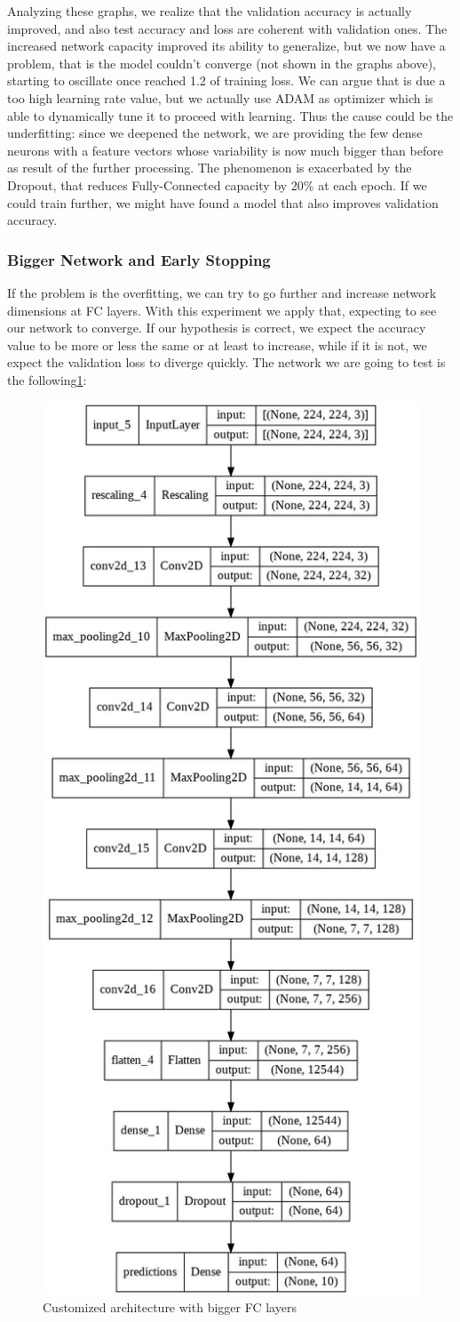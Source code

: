 \noindent Analyzing these graphs, we realize that the validation accuracy is actually improved, and also test accuracy and loss are coherent with validation ones. The increased network capacity improved its ability to generalize, but we now have a problem, that is the model couldn't converge (not shown in the graphs above), starting to oscillate once reached 1.2 of training loss. We can argue that is due a too high learning rate value, but we actually use ADAM as optimizer which is able to dynamically tune it to proceed with learning. Thus the cause could be the underfitting: since we deepened the network, we are providing the few dense neurons with a feature vectors whose variability is now much bigger than before as result of the further processing. The phenomenon is exacerbated by the Dropout, that reduces Fully-Connected capacity by 20\% at each epoch. If we could train further, we might have found a model that also improves validation accuracy.



\subsubsection{Bigger Network and Early Stopping}
If the problem is the overfitting, we can try to go further and increase network dimensions at FC layers. With this experiment we apply that, expecting to see our network to converge. If our hypothesis is correct, we expect the accuracy value to be more or less the same or at least to increase, while if it is not, we expect the validation loss to diverge quickly. The network we are going to test is the following\ref{fig:BiggerCNN}:

\begin{figure}[H]
	\centering
	\includegraphics[height=0.8\textwidth]{img/scratch/BiggerCNN.jpg}
	\caption{Customized architecture with bigger FC layers}
	\label{fig:BiggerCNN}
\end{figure}

